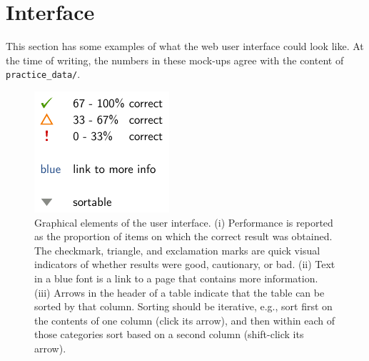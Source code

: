\clearpage
\section{Interface}
\label{sec:interface}

This section has some examples of what the web user interface could look like.
At the time of writing, the numbers in these mock-ups agree with the content of \texttt{practice\_data/}.

\begin{figure}[h]
    \begin{minipage}[c]{0.23\textwidth}
        \includegraphics[width=\textwidth]{images/legend}
    \end{minipage} \hfill
    \begin{minipage}[c]{0.72\textwidth}
        \caption{Graphical elements of the user interface.
            (i) Performance is reported as the proportion of items on which the correct result was obtained.
            The checkmark, triangle, and exclamation marks are quick visual indicators of whether results were good, cautionary, or bad.
            (ii) Text in a blue font is a link to a page that contains more information.
            (iii) Arrows in the header of a table indicate that the table can be sorted by that column.
            Sorting should be iterative, e.g., sort first on the contents of one column (click its arrow), and then within each of those categories sort based on a second column (shift-click its arrow).
        }
        \label{fig:ui_legend}
    \end{minipage}
\end{figure}

